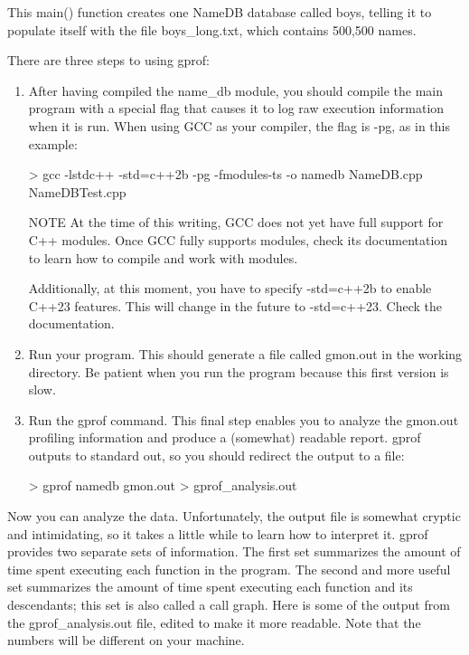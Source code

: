 This main() function creates one NameDB database called boys, telling it to populate itself with the file boys\_long.txt, which contains 500,500 names.

There are three steps to using gprof:

\begin{enumerate}
\item
After having compiled the name\_db module, you should compile the main program with a special flag that causes it to log raw execution information when it is run. When using GCC as your compiler, the flag is -pg, as in this example:

\begin{shell}
> gcc -lstdc++ -std=c++2b -pg -fmodules-ts -o namedb NameDB.cpp NameDBTest.cpp
\end{shell}

\begin{myNotic}{NOTE}
At the time of this writing, GCC does not yet have full support for C++ modules. Once GCC fully supports modules, check its documentation to learn how to compile and work with modules.

Additionally, at this moment, you have to specify -std=c++2b to enable C++23 features. This will change in the future to -std=c++23. Check the documentation.
\end{myNotic}

\item
Run your program. This should generate a file called gmon.out in the working directory. Be patient when you run the program because this first version is slow.

\item
Run the gprof command. This final step enables you to analyze the gmon.out profiling information and produce a (somewhat) readable report. gprof outputs to standard out, so you should redirect the output to a file:

\begin{shell}
> gprof namedb gmon.out > gprof_analysis.out
\end{shell}
\end{enumerate}

Now you can analyze the data. Unfortunately, the output file is somewhat cryptic and intimidating, so it takes a little while to learn how to interpret it. gprof provides two separate sets of information. The first set summarizes the amount of time spent executing each function in the program. The second and more useful set summarizes the amount of time spent executing each function and its descendants; this set is also called a call graph. Here is some of the output from the gprof\_analysis.out file, edited to make it more readable. Note that the numbers will be different on your machine.

